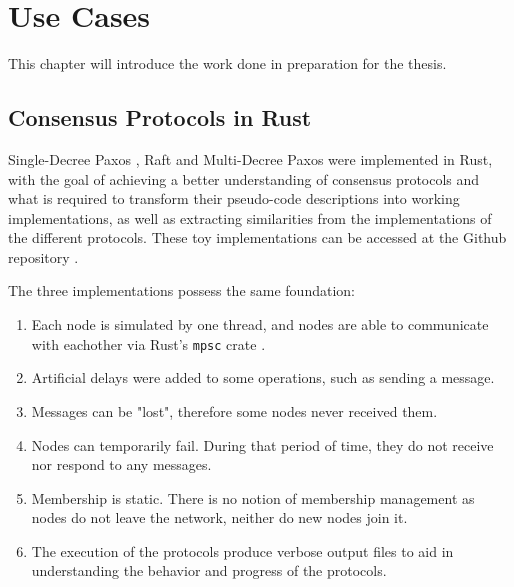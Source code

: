 

\chapter{Use Cases}
\label{cha:use_cases}

This chapter will introduce the work done in preparation for the thesis.

\section{Consensus Protocols in Rust}

Single-Decree Paxos \cite{paxos_made_simple}, Raft \cite{raft} \cite{paxos_vs_raft} and Multi-Decree Paxos \cite{paxos_live} \cite{paxos_vs_raft} were implemented in Rust, with the goal of achieving a better understanding of consensus protocols and what is required to transform their pseudo-code descriptions into working implementations, as well as extracting similarities from the implementations of the different protocols. These toy implementations can be accessed at the Github repository \cite{my_github}.

The three implementations possess the same foundation:

\begin{enumerate}
  \item Each node is simulated by one thread, and nodes are able to communicate with eachother via Rust's \texttt{mpsc} crate \cite{mpsc_rust}.
  \item Artificial delays were added to some operations, such as sending a message.
  \item Messages can be "lost", therefore some nodes never received them.
  \item Nodes can temporarily fail. During that period of time, they do not receive nor respond to any messages.
  \item Membership is static. There is no notion of membership management as nodes do not leave the network, neither do new nodes join it.
  \item The execution of the protocols produce verbose output files to aid in understanding the behavior and progress of the protocols.
\end{enumerate}


